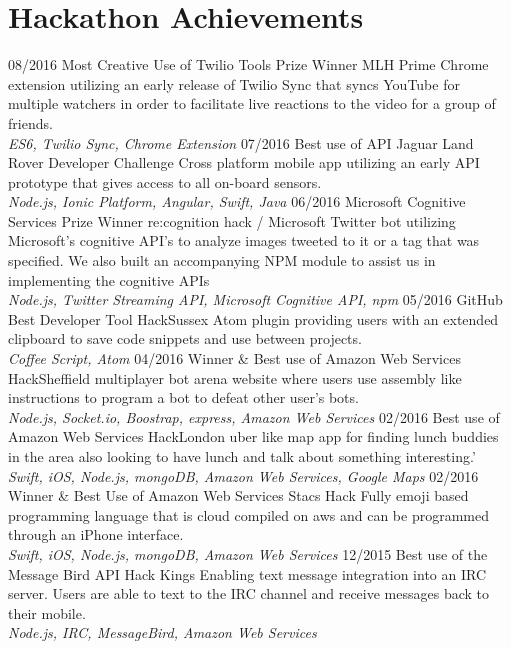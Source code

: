\documentclass[]{friggeri-cv}
\begin{document}
\section{Hackathon Achievements}
\begin{entrylist}
  \entry
    {08/2016}
    {Most Creative Use of Twilio Tools Prize Winner}
    {MLH Prime}
    {Chrome extension utilizing an early release of Twilio Sync that syncs YouTube for multiple watchers in order to facilitate live reactions to the video for a group of friends.\\
   	\emph{ES6, Twilio Sync, Chrome Extension}}
    \entry
    {07/2016}
    {Best use of API}
    {Jaguar Land Rover Developer Challenge}
    {Cross platform mobile app utilizing an early API prototype that gives access to all on-board sensors.\\
    \emph{Node.js, Ionic Platform, Angular, Swift, Java}}
        \entry
    {06/2016}
    {Microsoft Cognitive Services Prize Winner}
    {re:cognition hack / Microsoft}
    {Twitter bot utilizing Microsoft's cognitive API's to analyze images tweeted to it or a tag that was specified. We also built an accompanying NPM module to assist us in implementing the cognitive APIs\\
    \emph{Node.js, Twitter Streaming API, Microsoft Cognitive API, npm}}
        \entry
    {05/2016}
    {GitHub Best Developer Tool}
    {HackSussex}
    {Atom plugin providing users with an extended clipboard to save code snippets and use between projects. \\
    \emph{Coffee Script, Atom}}
        \entry
    {04/2016}
    {Winner \& Best use of Amazon Web Services}
    {HackSheffield}
    {multiplayer bot arena website where users use assembly like instructions to program a bot to defeat other user's bots.\\
\emph{Node.js, Socket.io, Boostrap, express, Amazon Web Services}}
        \entry
    {02/2016}
    {Best use of Amazon Web Services}
    {HackLondon}
    {uber like map app for finding lunch buddies in the area also looking to have lunch and talk about something interesting.'\\
    \emph{Swift, iOS, Node.js, mongoDB, Amazon Web Services, Google Maps}}
        \entry
    {02/2016}
    {Winner \& Best Use of Amazon Web Services}
    {Stacs Hack}
    {Fully emoji based programming language that is cloud compiled on aws and can be programmed through an iPhone interface.\\
    \emph{Swift, iOS, Node.js, mongoDB, Amazon Web Services}}
        \entry
    {12/2015}
    {Best use of the Message Bird API}
    {Hack Kings}
    {Enabling text message integration into an IRC server. Users are able to text to the IRC channel and receive messages back to their mobile. \\
    \emph{Node.js, IRC, MessageBird, Amazon Web Services}}
    \end{entrylist}
   
\end{document}

